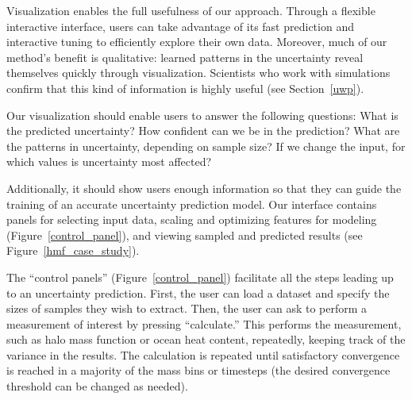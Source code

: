 Visualization enables the full usefulness of our approach. Through a flexible interactive interface, users can take advantage of its fast prediction and interactive tuning to efficiently explore their own data. Moreover, much of our method's benefit is qualitative: learned patterns in the uncertainty reveal themselves quickly through visualization. Scientists who work with simulations confirm that this kind of information is highly useful (see Section~\ref{uwp}).

Our visualization should enable users to answer the following questions: What is the predicted uncertainty? How confident can we be in the prediction? What are the patterns in uncertainty, depending on sample size? If we change the input, for which values is uncertainty most affected?

Additionally, it should show users enough information so that they can guide the training of an accurate uncertainty prediction model. Our interface contains panels for selecting input data, scaling and optimizing features for modeling (Figure~\ref{control_panel}), and viewing sampled and predicted results (see Figure~\ref{hmf_case_study}). 


The ``control panels'' (Figure~\ref{control_panel}) facilitate all the steps leading up to an uncertainty prediction. First, the user can load a dataset and specify the sizes of samples they wish to extract. Then, the user can ask to perform a measurement of interest by pressing ``calculate.'' This performs the measurement, such as halo mass function or ocean heat content, repeatedly, keeping track of the variance in the results. The calculation is repeated until satisfactory convergence is reached in a majority of the mass bins or timesteps (the desired convergence threshold can be changed as needed).

